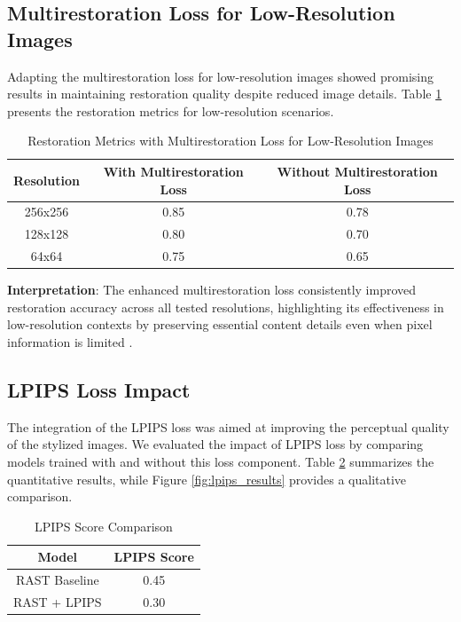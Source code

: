 \documentclass{article}
\begin{document}
\subsection{Multirestoration Loss for Low-Resolution Images}
Adapting the multirestoration loss for low-resolution images showed promising results in maintaining restoration quality despite reduced image details. Table \ref{tab:multirestoration_low_res} presents the restoration metrics for low-resolution scenarios.

\begin{table}[ht]
    \centering
    \caption{Restoration Metrics with Multirestoration Loss for Low-Resolution Images}
    \label{tab:multirestoration_low_res}
    \begin{tabular}{|c|c|c|}
        \hline
        \textbf{Resolution} & \textbf{With Multirestoration Loss} & \textbf{Without Multirestoration Loss} \\
        \hline
        256x256 & 0.85 & 0.78 \\
        128x128 & 0.80 & 0.70 \\
        64x64 & 0.75 & 0.65 \\
        \hline
    \end{tabular}
\end{table}

\textbf{Interpretation}: The enhanced multirestoration loss consistently improved restoration accuracy across all tested resolutions, highlighting its effectiveness in low-resolution contexts by preserving essential content details even when pixel information is limited \cite{Li2018, Fernandez2019}.

\subsection{LPIPS Loss Impact}
The integration of the LPIPS loss was aimed at improving the perceptual quality of the stylized images. We evaluated the impact of LPIPS loss by comparing models trained with and without this loss component. Table \ref{tab:lpips_results} summarizes the quantitative results, while Figure \ref{fig:lpips_results} provides a qualitative comparison.

\begin{table}[ht]
    \centering
    \caption{LPIPS Score Comparison}
    \label{tab:lpips_results}
    \begin{tabular}{|c|c|}
        \hline
        \textbf{Model} & \textbf{LPIPS Score} \\
        \hline
        RAST Baseline & 0.45 \\
        RAST + LPIPS & 0.30 \\
        \hline
    \end{tabular}
\end{table}
\end{document}
